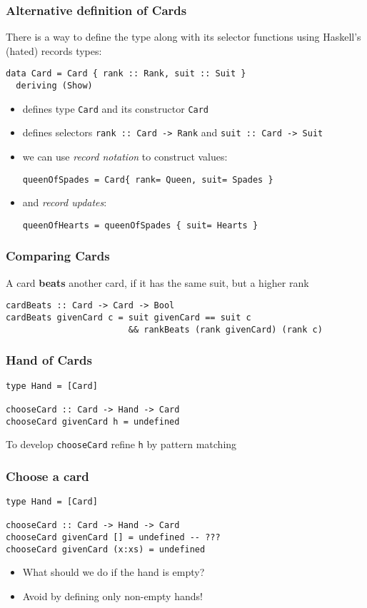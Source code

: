 \documentclass{beamer}
\begin{document}
\begin{frame}[fragile]
  \frametitle{Alternative definition of Cards}
  There is a way to define the type along with its selector
  functions using Haskell's (hated) records types:
\begin{lstlisting}
data Card = Card { rank :: Rank, suit :: Suit }
  deriving (Show)
\end{lstlisting}
  \begin{itemize}
  \item defines type \lstinline{Card} and its constructor
    \lstinline{Card}
  \item defines selectors \lstinline{rank :: Card -> Rank} and
    \lstinline{suit :: Card -> Suit}
  \item we can use \emph{record notation} to construct values:
\begin{lstlisting}[numbers=none]
queenOfSpades = Card{ rank= Queen, suit= Spades }
\end{lstlisting}
  \item and \emph{record updates}:
\begin{lstlisting}[numbers=none]
queenOfHearts = queenOfSpades { suit= Hearts }
\end{lstlisting}
  \end{itemize}
\end{frame}
\begin{frame}[fragile]
  \frametitle{Comparing Cards}
  A card \textbf{beats} another card, if it has the same
  suit, but a higher rank
\begin{lstlisting}
cardBeats :: Card -> Card -> Bool
cardBeats givenCard c = suit givenCard == suit c
                        && rankBeats (rank givenCard) (rank c)
\end{lstlisting}
\end{frame}
\begin{frame}[fragile]
  \frametitle{Hand of Cards}
\begin{lstlisting}
type Hand = [Card]

chooseCard :: Card -> Hand -> Card
chooseCard givenCard h = undefined
\end{lstlisting}
  To develop \texttt{chooseCard} refine \texttt{h} by pattern matching
\end{frame}
\begin{frame}[fragile]
  \frametitle{Choose a card}
\begin{lstlisting}
type Hand = [Card]

chooseCard :: Card -> Hand -> Card
chooseCard givenCard [] = undefined -- ???
chooseCard givenCard (x:xs) = undefined
\end{lstlisting}
  \begin{itemize}
  \item What should we do if the hand is empty?
  \item Avoid by defining only non-empty hands!
  \end{itemize}
\end{frame}
\end{document}
